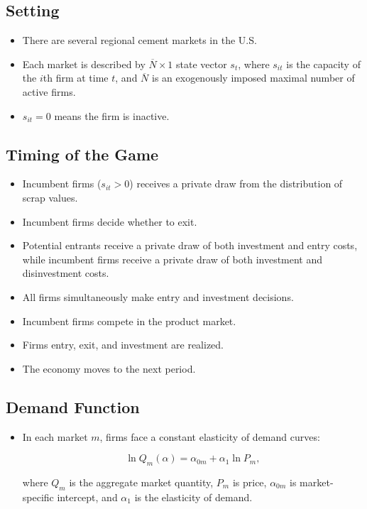 \documentclass[]{book}
\providecommand{\tightlist}{%
  \setlength{\itemsep}{0pt}\setlength{\parskip}{0pt}}
\begin{document}
\subsection{Setting}\label{setting-3}

\begin{itemize}
\tightlist
\item
  There are several regional cement markets in the U.S.
\item
  Each market is described by \(\overline{N} \times 1\) state vector
  \(s_t\), where \(s_{it}\) is the capacity of the \(i\)th firm at time
  \(t\), and \(\overline{N}\) is an exogenously imposed maximal number
  of active firms.
\item
  \(s_{it} = 0\) means the firm is inactive.
\end{itemize}

\subsection{Timing of the Game}\label{timing-of-the-game}

\begin{itemize}
\tightlist
\item
  Incumbent firms (\(s_{it} > 0\)) receives a private draw from the
  distribution of scrap values.
\item
  Incumbent firms decide whether to exit.
\item
  Potential entrants receive a private draw of both investment and entry
  costs, while incumbent firms receive a private draw of both investment
  and disinvestment costs.
\item
  All firms simultaneously make entry and investment decisions.
\item
  Incumbent firms compete in the product market.
\item
  Firms entry, exit, and investment are realized.
\item
  The economy moves to the next period.
\end{itemize}

\subsection{Demand Function}\label{demand-function}

\begin{itemize}
\tightlist
\item
  In each market \(m\), firms face a constant elasticity of demand
  curves:

  \begin{equation}
  \ln Q_m(\alpha) = \alpha_{0m} + \alpha_1 \ln P_m,
  \end{equation}

  where \(Q_m\) is the aggregate market quantity, \(P_m\) is price,
  \(\alpha_{0m}\) is market-specific intercept, and \(\alpha_1\) is the
  elasticity of demand.
\end{itemize}
\end{document}
